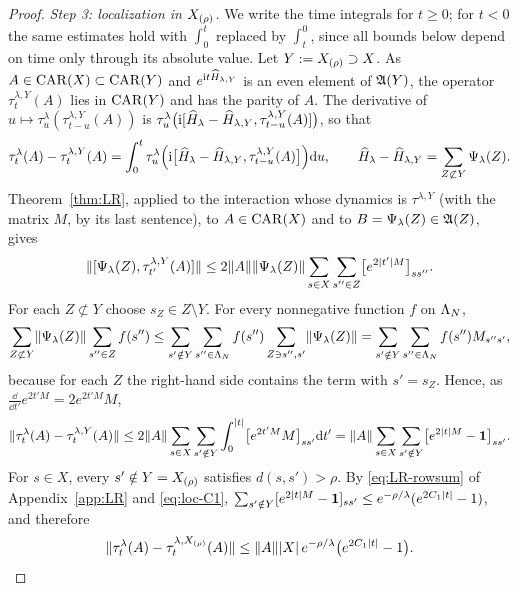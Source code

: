 \begin{proof}
\emph{Step 3: localization in $X_{(\rho)}$.} We write the time integrals for $t\ge0$; for $t<0$ the same estimates
hold with $\int_0^t$ replaced by $\int_t^0$, since all bounds below depend on time only through its absolute value.
Let $Y:=X_{(\rho)}\supset X$. As $A\in\mathrm{CAR}(X)\subset\mathrm{CAR}(Y)$ and $e^{\mathrm{i} t\widehat{H}_{\lambda,Y}}$ is an even element of
$\mathfrak{A}(Y)$, the operator $\tau^{\lambda,Y}_t(A)$ lies in $\mathrm{CAR}(Y)$ and has the parity of $A$. The derivative of
$u\mapsto\tau^\lambda_u(\tau^{\lambda,Y}_{t-u}(A))$ is $\tau^\lambda_u\bigl(\mathrm{i}[\widehat{H}_\lambda-\widehat{H}_{\lambda,Y},\tau^{\lambda,Y}_{t-u}(A)]\bigr)$,
so that
\[
\tau^\lambda_t(A)-\tau^{\lambda,Y}_t(A)=\int_0^t\tau^\lambda_u\Bigl(\mathrm{i}\bigl[\widehat{H}_\lambda-\widehat{H}_{\lambda,Y},\tau^{\lambda,Y}_{t-u}(A)\bigr]\Bigr)\mathrm{d} u,
\qquad\widehat{H}_\lambda-\widehat{H}_{\lambda,Y}=\sum_{Z\not\subset Y}\Psi_\lambda(Z).
\]
Theorem~\ref{thm:LR}, applied to the interaction whose dynamics is $\tau^{\lambda,Y}$ (with the matrix $M$, by its
last sentence), to $A\in\mathrm{CAR}(X)$ and to $B=\Psi_\lambda(Z)\in\mathfrak{A}(Z)$, gives
\[
\lVert[\Psi_\lambda(Z),\tau^{\lambda,Y}_{t'}(A)]\rVert\le2\lVert A\rVert\lVert\Psi_\lambda(Z)\rVert\sum_{s\in X}\sum_{s''\in Z}\bigl[e^{2\lvert t'\rvert M}\bigr]_{ss''}.
\]
For each $Z\not\subset Y$ choose $s_Z\in Z\setminus Y$. For every nonnegative function $f$ on $\Lambda_N$,
\[
\sum_{Z\not\subset Y}\lVert\Psi_\lambda(Z)\rVert\sum_{s''\in Z}f(s'')\le\sum_{s'\notin Y}\sum_{s''\in\Lambda_N}f(s'')\sum_{Z\ni s'',s'}\lVert\Psi_\lambda(Z)\rVert
=\sum_{s'\notin Y}\sum_{s''\in\Lambda_N}f(s'')M_{s''s'},
\]
because for each $Z$ the right-hand side contains the term with $s'=s_Z$. Hence, as
$\frac{\dd}{\dd t'}e^{2t'M}=2e^{2t'M}M$,
\[
\lVert\tau^\lambda_t(A)-\tau^{\lambda,Y}_t(A)\rVert\le2\lVert A\rVert\sum_{s\in X}\sum_{s'\notin Y}\int_0^{\lvert t\rvert}\bigl[e^{2t'M}M\bigr]_{ss'}\mathrm{d} t'
=\lVert A\rVert\sum_{s\in X}\sum_{s'\notin Y}\bigl[e^{2\lvert t\rvert M}-\mathbf{1}\bigr]_{ss'}.
\]
For $s\in X$, every $s'\notin Y=X_{(\rho)}$ satisfies $d(s,s')>\rho$. By \eqref{eq:LR-rowsum} of Appendix~\ref{app:LR}
and \eqref{eq:loc-C1}, $\sum_{s'\notin Y}[e^{2\lvert t\rvert M}-\mathbf{1}]_{ss'}\le e^{-\rho/\lambda}(e^{2C_1\lvert t\rvert}-1)$, and therefore
\begin{equation}\label{eq:loc-localize}
\lVert\tau^\lambda_t(A)-\tau^{\lambda,X_{(\rho)}}_t(A)\rVert\le\lVert A\rVert\lvert X\rvert\,e^{-\rho/\lambda}\bigl(e^{2C_1\lvert t\rvert}-1\bigr).
\end{equation}


\end{proof}
